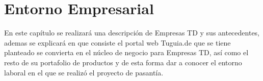 \chapter{Entorno Empresarial} \label{chap:entorno}

\vspace{5 mm}

En este capítulo se realizará una descripción de Empresas TD y sus antecedentes, ademas se explicará en que consiste el portal web Tuguia.de que se tiene planteado se convierta en el núcleo de negocio para Empresas TD, así como el resto de su portafolio de productos y de esta forma dar a conocer el entorno laboral en el que se realizó el proyecto de pasantía.

  